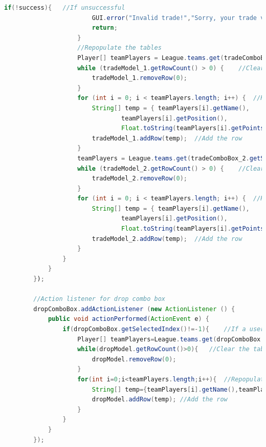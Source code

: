 \documentclass[12pt]{report}
\begin{document}
\begin{singlespace}
\begin{lstlisting}[language=Java,label=some-code,caption={GUI.java}]
					if(!success){	//If unsuccessful
						GUI.error("Invalid trade!","Sorry, your trade violates rules of the league.");
						return;
					}
					//Repopulate the tables
					Player[] teamPlayers = League.teams.get(tradeComboBox_1.getSelectedItem()).getPlayers();
					while (tradeModel_1.getRowCount() > 0) {	//Clear the left trade table
						tradeModel_1.removeRow(0);
					}
					for (int i = 0; i < teamPlayers.length; i++) {	//Repopulate the left trade table
						String[] temp = { teamPlayers[i].getName(),
								teamPlayers[i].getPosition(),
								Float.toString(teamPlayers[i].getPoints()) };
						tradeModel_1.addRow(temp);	//Add the row
					}
					teamPlayers = League.teams.get(tradeComboBox_2.getSelectedItem()).getPlayers();
					while (tradeModel_2.getRowCount() > 0) {	//Clear the left trade table
						tradeModel_2.removeRow(0);
					}
					for (int i = 0; i < teamPlayers.length; i++) {	//Repopulate the left trade table
						String[] temp = { teamPlayers[i].getName(),
								teamPlayers[i].getPosition(),
								Float.toString(teamPlayers[i].getPoints()) };
						tradeModel_2.addRow(temp);	//Add the row
					}
                }
			}
		});
		
		//Action listener for drop combo box
		dropComboBox.addActionListener (new ActionListener () {
		    public void actionPerformed(ActionEvent e) {
		    	if(dropComboBox.getSelectedIndex()!=-1){	//If a user is selected
			    	Player[] teamPlayers=League.teams.get(dropComboBox.getSelectedItem()).getPlayers();	//Get the user's players
			    	while(dropModel.getRowCount()>0){	//Clear the table
			    		dropModel.removeRow(0);
			    	}
			    	for(int i=0;i<teamPlayers.length;i++){	//Repopulate the table
			    		String[] temp={teamPlayers[i].getName(),teamPlayers[i].getPosition(),Float.toString(teamPlayers[i].getPoints())};
			    		dropModel.addRow(temp);	//Add the row
			    	}
		    	}
		    }
		});
		

\end{lstlisting}
\end{singlespace}
\end{document}
